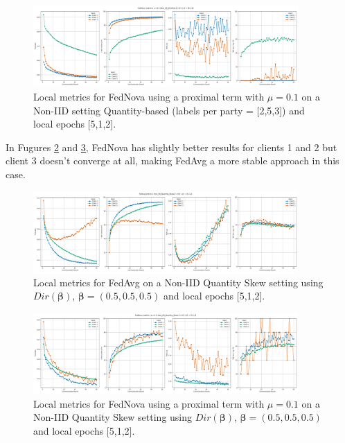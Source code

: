\begin{figure}[H]
  \centering
  \includegraphics[width=0.9\textwidth]{figures/2-Federated_Learning/FedNova_QuantityBased_Labels_253_LE_512.png}
  \caption{Local metrics for FedNova using a proximal term with $\mu=0.1$ on a Non-IID setting Quantity-based (labels per party = [2,5,3]) and local epochs [5,1,2].}
  \label{fig:FedNova_QuantityBased_LabelsPerParty_253_LE_512}
\end{figure}

In Fugures \ref{fig:FedAvg_QuantitySkew_LE_512} and \ref{fig:FedNova_QuantitySkew_LE_512}, FedNova has slightly better results for clients 1 and 2 but client 3 doesn't converge at all, making FedAvg a more stable approach in this case.

\begin{figure}[H]
  \centering
  \includegraphics[width=0.9\textwidth]{figures/2-Federated_Learning/FedAvg_QuantitySkew_LE_512.png}
  \caption{Local metrics for FedAvg  on a Non-IID Quantity Skew setting using $Dir(\boldsymbol{\beta})$, $\boldsymbol{\beta}=(0.5, 0.5, 0.5)$ and local epochs [5,1,2].}
  \label{fig:FedAvg_QuantitySkew_LE_512}
\end{figure}


\begin{figure}[H]
  \centering
  \includegraphics[width=0.9\textwidth]{figures/2-Federated_Learning/FedNova_QuantitySkew_LE_512.png}
  \caption{Local metrics for FedNova using a proximal term with $\mu=0.1$ on a Non-IID Quantity Skew setting using $Dir(\boldsymbol{\beta})$, $\boldsymbol{\beta}=(0.5,0.5,0.5)$ and local epochs [5,1,2].}
  \label{fig:FedNova_QuantitySkew_LE_512}
\end{figure}

